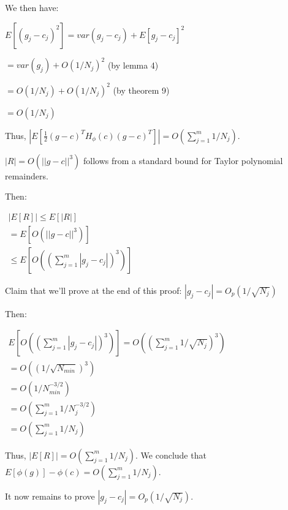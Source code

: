 \documentclass{article}
\begin{document}
We then have:

$\displaystyle E\left[\left( g_{j} -c_{j}\right)^{2}\right] =var\left( g_{j} -c_{j}\right) +E\left[ g_{j} -c_{j}\right]^{2}$

$\displaystyle =var\left( g_{j}\right) +O\left( 1/N_{j}\right)^{2}$ (by lemma 4)

$\displaystyle =O\left( 1/N_{j}\right) +O\left( 1/N_{j}\right)^{2}$ (by theorem 9)

$\displaystyle =O\left( 1/N_{j}\right)$

Thus, $\displaystyle |E\left[\frac{1}{2}\left( g-c\right)^{T} H_{\phi }\left( c\right)\left( g-c\right)^{T}\right] |=O\left(\sum _{j=1}^{m} 1/N_{j}\right)$.

$\displaystyle |R|=O\left( ||g-c||^{3}\right)$ follows from a standard bound for Taylor polynomial remainders.

Then:

$\displaystyle \begin{array}{l}
|E\left[ R\right] |\leqslant E\left[ |R|\right]\\
=E\left[ O\left( ||g-c||^{3}\right)\right]\\
\leqslant E\left[ O\left(\left(\sum _{j=1}^{m} |g_{j} -c_{j} |\right)^{3}\right)\right]
\end{array}$

Claim that we'll prove at the end of this proof: $\displaystyle |g_{j} -c_{j} |=O_{p}\left( 1/\sqrt{N_{j}}\right)$

Then:

$\displaystyle  \begin{array}{l}
E\left[ O\left(\left(\sum _{j=1}^{m} |g_{j} -c_{j} |\right)^{3}\right)\right] =O\left(\left(\sum _{j=1}^{m} 1/\sqrt{N_{j}}\right)^{3}\right)\\
=O\left(\left( 1/\sqrt{N_{min}}\right)^{3}\right)\\
=O\left( 1/N_{min}^{-3/2}\right)\\
=O\left(\sum _{j=1}^{m} 1/N_{j}^{-3/2}\right)\\
=O\left(\sum _{j=1}^{m} 1/N_{j}\right)
\end{array}$

Thus, $\displaystyle |E\left[ R\right] |=O\left(\sum _{j=1}^{m} 1/N_{j}\right)$. We conclude that $\displaystyle E\left[ \phi \left( g\right)\right] -\phi \left( c\right) =O\left(\sum _{j=1}^{m} 1/N_{j}\right)$.

It now remains to prove $\displaystyle |g_{j} -c_{j} |=O_{p}\left( 1/\sqrt{N_{j}}\right)$.
\end{document}
